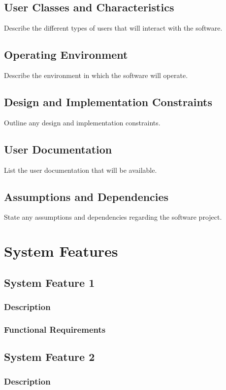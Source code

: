 \documentclass{article}
\begin{document}
\subsection{User Classes and Characteristics}
Describe the different types of users that will interact with the software.

\subsection{Operating Environment}
Describe the environment in which the software will operate.

\subsection{Design and Implementation Constraints}
Outline any design and implementation constraints.

\subsection{User Documentation}
List the user documentation that will be available.

\subsection{Assumptions and Dependencies}
State any assumptions and dependencies regarding the software project.

\section{System Features}
\subsection{System Feature 1}
\subsubsection{Description}
\subsubsection{Functional Requirements}

\subsection{System Feature 2}
\subsubsection{Description}
\end{document}
